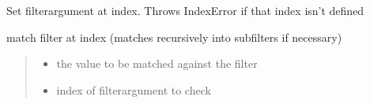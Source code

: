 \documentclass[a4paper,10pt,english]{sphinxmanual}
\begin{document}
\begin{fulllineitems}
\begin{fulllineitems}
\end{fulllineitems}


\begin{fulllineitems}
\label{\detokenize{fagus.filters:fagus.filters.KFil.__setitem__}}
\pysigstartsignatures
{}
\pysigstopsignatures
\sphinxAtStartPar
Set filter\sphinxhyphen{}argument at index. Throws IndexError if that index isn’t defined

\end{fulllineitems}


\begin{fulllineitems}
\label{\detokenize{fagus.filters:fagus.filters.KFil.match}}
\pysigstartsignatures
{}
\pysigstopsignatures
\sphinxAtStartPar
match filter at index (matches recursively into subfilters if necessary)
\begin{quote}\begin{description}
\begin{itemize}
\item {}
\sphinxAtStartPar
{} \textendash{} the value to be matched against the filter

\item {}
\sphinxAtStartPar
{} \textendash{} index of filter\sphinxhyphen{}argument to check


\end{itemize}
\end{description}
\end{quote}
\end{fulllineitems}
\end{fulllineitems}
\end{document}
